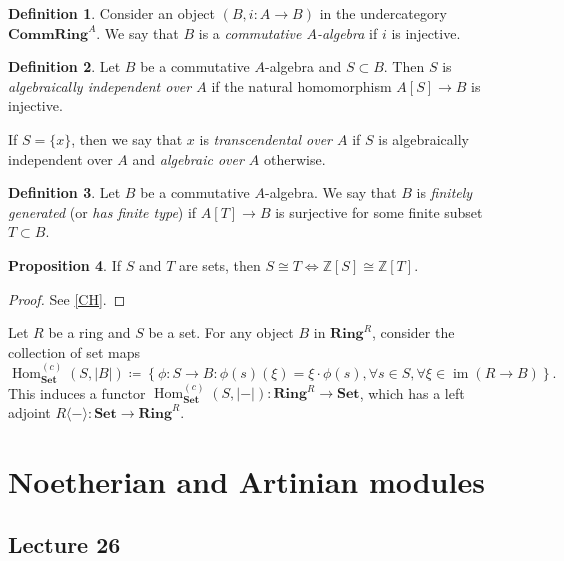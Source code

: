 \documentclass[10pt,letterpaper,cm]{nupset}
\theoremstyle{definition}
\newtheorem{definition}{Definition}[subsection]
\theoremstyle{theorem}
\newtheorem{prop}[definition]{Proposition}
\theoremstyle{remark}
\newcommand{\Z}{\mathbb Z}
\newcommand{\1}{\mathbf{1}}
\newcommand{\0}{\vec 0}
\begin{document}
\medskip

\begin{definition}
Consider an object $\left(B, i : A \to B\right)$ in the undercategory $\mathbf{CommRing}^A$. We say that $B$ is a \textit{commutative $A$-algebra} if $i$ is injective. 
\end{definition}

\begin{definition}
Let $B$ be a commutative $A$-algebra and $S\subset B$. Then $S$ is \textit{algebraically independent over $A$} if the natural homomorphism $A[S] \to B$ is injective. 

If $S=\{x\}$, then we say that $x$ is \textit{transcendental over $A$} if $S$ is algebraically independent over $A$ and \textit{algebraic over $A$} otherwise.
\end{definition}

\begin{definition}
Let $B$ be a commutative $A$-algebra. We say that $B$ is \textit{finitely generated} (or \textit{has finite type}) if $A[T] \to B$ is surjective for some finite subset $T\subset B$.
\end{definition}

\medskip

\begin{prop}
If $S$ and $T$ are sets, then $S\cong T \iff \Z[S]\cong \Z[T]$.
\end{prop}
\begin{proof}
See \cref{CH}.
\end{proof}

\bigskip

Let $R$ be a ring and $S$ be a set. For any object $B$ in $\mathbf{Ring}^R$, consider the collection of set maps
\[
\operatorname{Hom}_{\mathbf{Set}}^{(c)}(S,\lvert{B}\rvert)\coloneqq \left\{\phi: S \rightarrow B: \phi(s)(\xi)=\xi \cdot \phi(s), \forall{s} \in S, \forall{\xi} \in \operatorname{im}(R \rightarrow B)\right\}. 
\]
This induces a functor $\operatorname{Hom}_{\mathbf{Set}}^{(c)}(S,\lvert{-}\rvert) : \mathbf{Ring}^R \to \mathbf{Set}$, which has a left adjoint $R\langle{-}\rangle : \mathbf{Set} \to \mathbf{Ring}^R$.


\section{Noetherian and Artinian modules}

\subsection{Lecture 26}
\end{document}

